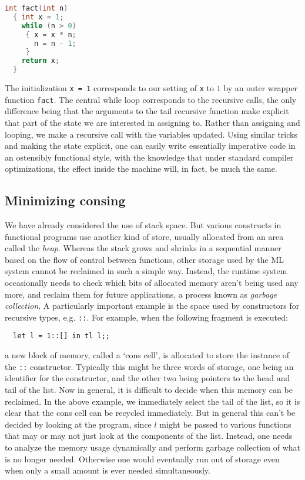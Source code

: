 \begin{lstlisting}[language=C]
  int fact(int n)
  { int x = 1;
    while (n > 0)
     { x = x * n;
       n = n - 1;
     }
    return x;
  }
\end{lstlisting}

The initialization {\tt x = 1} corresponds to our setting of {\tt x} to $1$ by
an outer wrapper function {\tt fact}. The central while loop corresponds to the
recursive calls, the only difference being that the arguments to the tail
recursive function make explicit that part of the state we are interested in
assigning to. Rather than assigning and looping, we make a recursive call with
the variables updated. Using similar tricks and making the state explicit, one
can easily write essentially imperative code in an ostensibly functional style,
with the knowledge that under standard compiler optimizations, the effect
inside the machine will, in fact, be much the same.

\subsection{Minimizing consing}

We have already considered the use of stack space. But various constructs in
functional programs use another kind of store, usually allocated from an area
called the {\em heap}. Whereas the stack grows and shrinks in a sequential
manner based on the flow of control between functions, other storage used by
the ML system cannot be reclaimed in such a simple way. Instead, the runtime
system occasionally needs to check which bits of allocated memory aren't being
used any more, and reclaim them for future applications, a process known as
{\em garbage collection}. A particularly important example is the space used by
constructors for recursive types, e.g. {\tt ::}. For example, when the
following fragment is executed:

\begin{boxed}\begin{lstlisting}
  let l = 1::[] in tl l;;
\end{lstlisting}\end{boxed}

\noindent a new block of memory, called a `cons cell', is allocated to store
the instance of the {\tt ::} constructor. Typically this might be three words
of storage, one being an identifier for the constructor, and the other two
being pointers to the head and tail of the list. Now in general, it is
difficult to decide when this memory can be reclaimed. In the above example, we
immediately select the tail of the list, so it is clear that the cons cell can
be recycled immediately. But in general this can't be decided by looking at the
program, since $l$ might be passed to various functions that may or may not
just look at the components of the list. Instead, one needs to analyze the
memory usage dynamically and perform garbage collection of what is no longer
needed. Otherwise one would eventually run out of storage even when only a
small amount is ever needed simultaneously.

